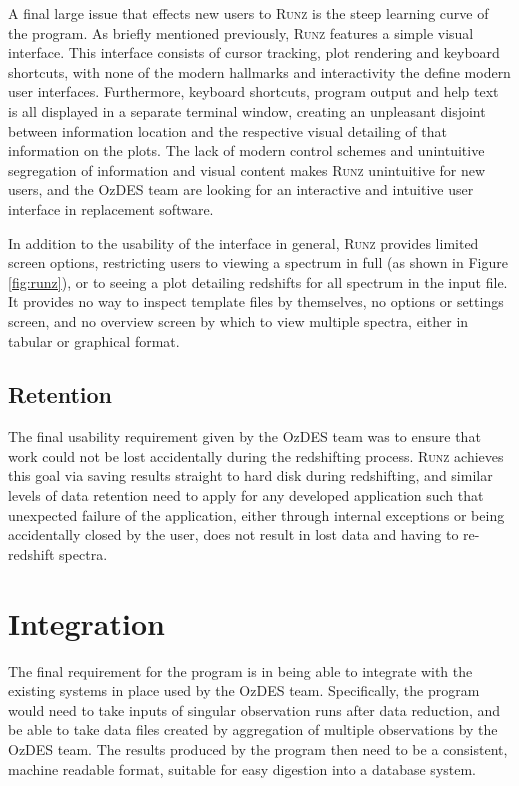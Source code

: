 \documentclass[titlesmallcaps, examinerscopy, copyrightpage]{uqthesis}
\newcommand{\runz}{\textsc{Runz}}
\begin{document}
A final large issue that effects new users to \textsc{Runz} is the steep learning curve of the program. As briefly mentioned previously, \runz{} features a simple visual interface. This interface consists of cursor tracking, plot rendering and keyboard shortcuts, with none of the modern hallmarks and interactivity the define modern user interfaces. Furthermore, keyboard shortcuts, program output and help text is all displayed in a separate terminal window, creating an unpleasant disjoint between information location and the respective visual detailing of that information on the plots. The lack of modern control schemes and unintuitive segregation of information and visual content makes \runz{} unintuitive for new users, and the OzDES team are looking for an interactive and intuitive user interface in replacement software.

In addition to the usability of the interface in general, \runz{} provides limited screen options, restricting users to viewing a spectrum in full (as shown in Figure \ref{fig:runz}), or to seeing a plot detailing redshifts for all spectrum in the input file. It provides no way to inspect template files by themselves, no options or settings screen, and no overview screen by which to view multiple spectra, either in tabular or graphical format.

\subsection{Retention}

The final usability requirement given by the OzDES team was to ensure that work could not be lost accidentally during the redshifting process. \runz{} achieves this goal via saving results straight to hard disk during redshifting, and similar levels of data retention need to apply for any developed application such that unexpected failure of the application, either through internal exceptions or being accidentally closed by the user, does not result in lost data and having to re-redshift spectra.


\section{Integration}

The final requirement for the program is in being able to integrate with the existing systems in place used by the OzDES team. Specifically, the program would need to take inputs of singular observation runs after data reduction, and be able to take data files created by aggregation of multiple observations by the OzDES team. The results produced by the program then need to be a consistent, machine readable format, suitable for easy digestion into a database system.
\end{document}
